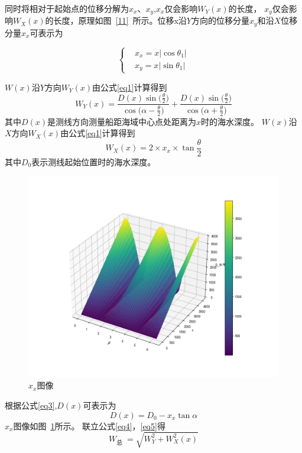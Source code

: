\documentclass[withoutpreface,bwprint]{cumcmthesis} %
\begin{document}
    同时将相对于起始点的位移分解为$x_{x}、x_{y}$,$x_{x}$仅会影响$W_Y(x)$的长度，
    $x_{y}$仅会影响$W_X(x)$的长度，原理如图~\ref{11}~所示。位移x沿$Y$方向的位移分量$x_y$和沿$X$位移分量$x_x$可表示为


    \begin{equation}
        \left\{
        \begin{aligned}
            &x_x=x |\cos \theta_1|\\
            &x_y=x |\sin \theta_1|
        \end{aligned}
        \right.
    \end{equation}


    $W(x)$沿$Y$方向$W_Y(x)$由公式\ref{eq1}计算得到
    \begin{equation}
        W_Y(x)=\frac{D(x) \sin{(\frac{\theta}{2}})}{\cos{(\alpha-\frac{\theta}{2}})}+\frac{D(x) \sin{(\frac{\theta}{2}})}{\cos{(\alpha+\frac{\theta}{2}})}
        \label{eq4}
    \end{equation} 
    其中$D(x)$是测线方向测量船距海域中心点处距离为$x$时的海水深度。
    $W(x)$沿$X$方向$W_X(x)$由公式\ref{eq1}计算得到
    \begin{equation}
        W_X(x)=2 \times x_x\times \tan{\frac{\theta}{2}}
    \end{equation}
    其中$D_0$表示测线起始位置时的海水深度。
   

    \begin{figure}[htbp]
        \centering
        \includegraphics[width=.6\textwidth]{第二问2.png}
        \caption{$x_x$图像}
        \label{12}
    \end{figure}
    
    根据公式\ref{eq3},$D(x)$可表示为
    \begin{equation}
        D(x)=D_0-x_x\tan{\alpha}
        \label{eq5}
    \end{equation}
    $x_x$图像如图~\ref{12}所示。
    联立公式\ref{eq4}，\ref{eq5}得   
    \begin{equation}
        W_{\text {总 }}=\sqrt{W_Y^2+W_X^2(x)}
    \end{equation}
\end{document}
